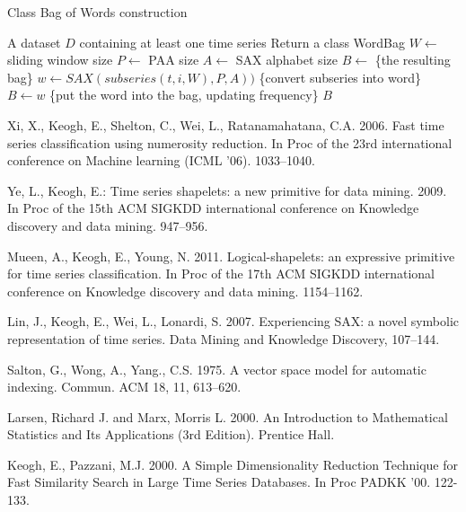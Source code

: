 \documentclass{llncs}
\begin{document}
\begin{algorithm}
\caption{Class Bag of Words construction}
\label{alg1}
\begin{algorithmic}[1]
\REQUIRE A dataset $D$ containing at least one time series
\ENSURE Return a class WordBag
\STATE $W \leftarrow$ sliding window size
\STATE $P \leftarrow$ PAA size
\STATE $A \leftarrow$ SAX alphabet size
\STATE $B \leftarrow$ \{the resulting bag\}
 \STATE $w \leftarrow SAX(subseries(t,i,W), P, A))$ \{convert subseries into word\}
 \STATE $B \leftarrow w$ \{put the word into the bag, updating frequency\}
 \ENDFOR
\ENDFOR
\RETURN $B$
\end{algorithmic}
\end{algorithm}

%
%
\begin{thebibliography}{5}

%

Xi, X., Keogh, E., Shelton, C., Wei, L., Ratanamahatana, C.A. 2006. 
Fast time series classification using numerosity reduction. 
In Proc of the 23rd international conference on Machine learning (ICML '06). 1033--1040.

Ye, L., Keogh, E.:
Time series shapelets: a new primitive for data mining. 2009.
In Proc of the 15th ACM SIGKDD international conference on Knowledge discovery and data
mining. 947--956.

Mueen, A., Keogh, E., Young, N. 2011.
Logical-shapelets: an expressive primitive for time series classification.
In Proc of the 17th ACM SIGKDD international conference on Knowledge discovery and data
mining. 1154--1162.

Lin, J., Keogh, E., Wei, L., Lonardi, S. 2007.
Experiencing SAX: a novel symbolic representation of time series.
Data Mining and Knowledge Discovery, 107--144.

Salton, G., Wong, A., Yang., C.S. 1975.
A vector space model for automatic indexing. 
Commun. ACM 18, 11, 613--620.

Larsen, Richard J. and Marx, Morris L. 2000. 
An Introduction to Mathematical Statistics and Its Applications (3rd Edition).
Prentice Hall.

Keogh, E., Pazzani, M.J. 2000.
A Simple Dimensionality Reduction Technique for Fast Similarity Search in Large Time Series
Databases. 
In Proc PADKK '00. 122-133.


\end{thebibliography}
\end{document}
